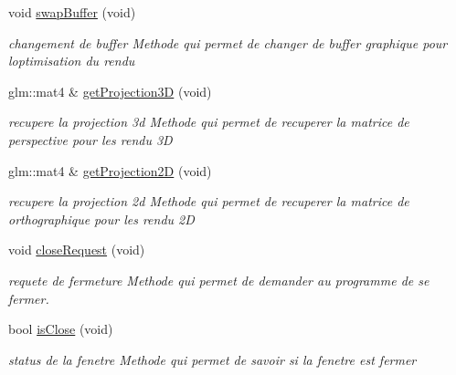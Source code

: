 \begin{DoxyCompactItemize}
void \mbox{\hyperlink{class_beer_engine_1_1_window_a3b2c31a149ed0b90ac292d88f87fd369}{swap\+Buffer}} (void)
\begin{DoxyCompactList}\small\item\em changement de buffer Methode qui permet de changer de buffer graphique pour l\textquotesingle{}optimisation du rendu \end{DoxyCompactList}\item 
glm\+::mat4 \& \mbox{\hyperlink{class_beer_engine_1_1_window_a5f6872e397ddae51b61d0d140d3dca82}{get\+Projection3D}} (void)
\begin{DoxyCompactList}\small\item\em recupere la projection 3d Methode qui permet de recuperer la matrice de perspective pour les rendu 3D \end{DoxyCompactList}\item 
glm\+::mat4 \& \mbox{\hyperlink{class_beer_engine_1_1_window_a69da83af4143505f1e2c14649a854bd5}{get\+Projection2D}} (void)
\begin{DoxyCompactList}\small\item\em recupere la projection 2d Methode qui permet de recuperer la matrice de orthographique pour les rendu 2D \end{DoxyCompactList}\item 
void \mbox{\hyperlink{class_beer_engine_1_1_window_a0ff67069f460adb018b1050da62d8a54}{close\+Request}} (void)
\begin{DoxyCompactList}\small\item\em requete de fermeture Methode qui permet de demander au programme de se fermer. \end{DoxyCompactList}\item 
bool \mbox{\hyperlink{class_beer_engine_1_1_window_a5b29d76b11e9f7457a92e6465939b71d}{is\+Close}} (void)
\begin{DoxyCompactList}\small\item\em status de la fenetre Methode qui permet de savoir si la fenetre est fermer \end{DoxyCompactList}\end{DoxyCompactItemize}
